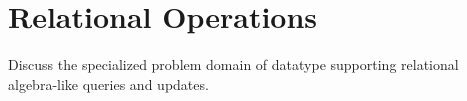 \section{Relational Operations}

Discuss the specialized problem domain of datatype supporting
relational algebra-like queries and updates.
